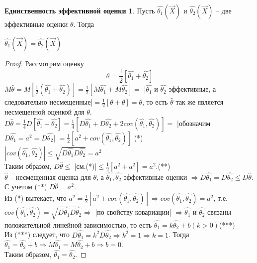 \documentclass[a4paper, 12pt]{article}
\theoremstyle{definition}
\theoremstyle{leads}
\theoremstyle{example}
\begin{document}
\newtheorem*{only}{Единственность эффективной оценки}
\begin{only}
	Пусть $\hat{\theta_1}(\vec{X})$ и $\hat{\theta_2}(\vec{X})$ -- две эффективные оценки $\theta$. Тогда 
	\begin{center}
		\centering
		$\hat{\theta_1}(\vec{X}) = \hat{\theta_2}(\vec{X})$
	\end{center}
\end{only}
\begin{proof}
Рассмотрим оценку 
\begin{displaymath}
	\hat{\theta} = \frac{1}{2}[\hat{\theta_1} + \hat{\theta_2}]
\end{displaymath}
$M \hat{\theta} = M[\frac{1}{2} (\hat{\theta_1} + \hat{\theta_2})] = \frac{1}{2} [M \hat{\theta_1} + M \hat{\theta_2}] =$ |$\hat{\theta_1}$ и $\hat{\theta_2}$ эффективные, а следовательно несмещенные|$ = \frac{1}{2}[\theta + \theta] = \theta$, то есть $\hat{\theta}$ так же является несмещенной оценкой для $\theta$.\\

$D \hat{\theta} = \frac{1}{4} D[\hat{\theta_1} + \hat{\theta_2}] = \frac{1}{4} [D \hat{\theta_1} + D \hat{\theta_2} + 2cov(\hat{\theta_1}, \hat{\theta_2})] = $ |обозначим $D\hat{\theta_1} = a^2 = D \hat{\theta_2}$| $= \frac{1}{2} [a^2 + cov(\hat{\theta_1}, \hat{\theta_2})] $ (*)\\

$|cov (\hat{\theta_1}, \hat{\theta_2})| \leq \sqrt{D \hat{\theta_1} D \hat{\theta_2}} = a^2$\\

Таким образом, $D \hat{\theta} \leq$ |см.(*)|$ \leq \frac{1}{2} [a^2 + a^2] = a^2$.(**)\\

$\hat{\theta}$ -- несмещенная оценка для $\theta$, а $\hat{\theta_1}, \hat{\theta_2}$ эффективные оценки $\Longrightarrow D \hat{\theta_1} = D\hat{\theta_2} \leq D\hat{\theta}$. С учетом (**) $D \hat{\theta} = a^2$.\\

Из  (*)  вытекает, что 
$a^2 = \frac{1}{2} [a^2 + cov(\hat{\theta_1}, \hat{\theta_2})] \Longrightarrow cov(\hat{\theta_1}, \hat{\theta_2}) = a^2 $, т.е. $cov(\hat{\theta_1}, \hat{\theta_2}) = \sqrt{D \hat{\theta_1} D\hat{\theta_2}} \Longrightarrow$ |по свойству ковариации| $\Longrightarrow \hat{\theta_1}$ и  $\hat{\theta_2}$ связаны положительной линейной зависимостью, то есть $\hat{\theta_1} = k \hat{\theta_2} + b(k > 0)$(***)\\
Из (***) следует, что $D \hat{\theta_1} = k^2 D \hat{\theta_2} \Longrightarrow k^2 = 1 \Longrightarrow k = 1$. Тогда $\hat{\theta_1} = \hat{\theta_2} + b \Longrightarrow M \hat{\theta_1} = M \hat{\theta_2} + b \Longrightarrow b = 0$.\\
Таким образом, $ \hat{\theta_1} = \hat{\theta_2}$.
\end{proof}
\end{document}
